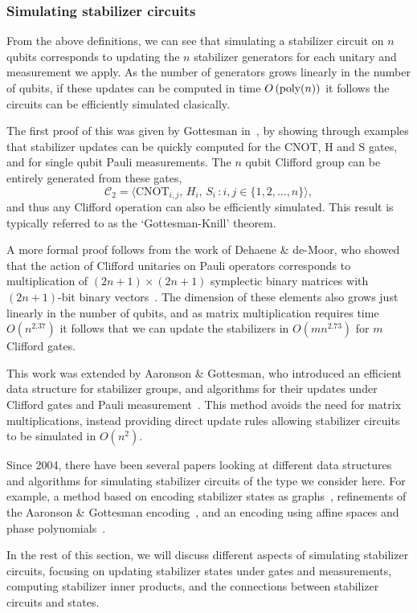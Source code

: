 \subsubsection*{Simulating stabilizer circuits}
From the above definitions, we can see that simulating a stabilizer circuit on $n$ qubits corresponds to updating the $n$ stabilizer generators for each unitary and measurement we apply. As the number of generators grows linearly in the number of qubits, if these updates can be computed in time $O\left(\text{poly} (n)\right)$ it follows the circuits can be efficiently simulated clasically.\par
The first proof of this was given by Gottesman in~\cite{Gottesman1998b}, by showing through examples that stabilizer updates can be quickly computed for the CNOT, H and S gates, and for single qubit Pauli measurements. The $n$ qubit Clifford group can be entirely generated from these gates,
\begin{equation}
    \mathcal{C}_{2} = \langle \text{CNOT}_{i,j},\, H_{i},\, S_{i}\,:i,j\in \{1,2,\dots,n\}\rangle, \label{eq:cliffordgen}
\end{equation}
and thus any Clifford operation can also be efficiently simulated. This result is typically referred to as the `Gottesman-Knill' theorem.\par
A more formal proof follows from the work of Dehaene \& de-Moor, who showed that the action of Clifford unitaries on Pauli operators corresponds to multiplication of $(2n+1)\times (2n+1)$ symplectic binary matrices with $(2n+1)$-bit binary vectors~\cite{Dehaene2003}. The dimension of these elements also grows just linearly in the number of qubits, and as matrix multiplication requires time $O(n^{2.37})$ it follows that we can update the stabilizers in $O(mn^{2.73})$ for $m$ Clifford gates.\par
This work was extended by Aaronson \& Gottesman, who introduced an efficient data structure for stabilizer groups, and algorithms for their updates under Clifford gates and Pauli measurement~\cite{Aaronson2004}. This method avoids the need for matrix multiplications, instead providing direct update rules allowing stabilizer circuits to be simulated in $O(n^{2})$.\par
Since 2004, there have been several papers looking at different data structures and algorithms for simulating stabilizer circuits of the type we consider here. For example, a method based on encoding stabilizer states as graphs~\cite{Anders2006}, refinements of the Aaronson \& Gottesman encoding~\cite{Garcia2012}, and an encoding using affine spaces and phase polynomials~\cite{VandenNest2008,Bravyi2016}.\par
In the rest of this section, we will discuss different aspects of simulating stabilizer circuits, focusing on updating stabilizer states under gates and measurements, computing stabilizer inner products, and the connections between stabilizer circuits and states.
